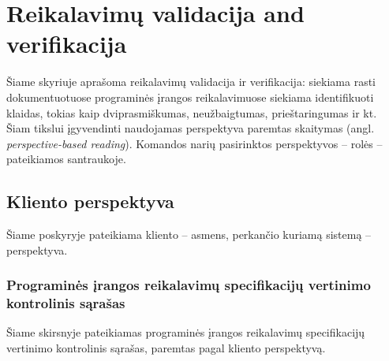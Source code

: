 \documentclass{VUMIFPSkursinis}
\begin{document}

\section{Reikalavimų validacija and verifikacija}

Šiame skyriuje aprašoma reikalavimų validacija ir verifikacija: siekiama rasti dokumentuotuose programinės įrangos
reikalavimuose siekiama identifikuoti klaidas, tokias kaip dviprasmiškumas, neužbaigtumas, prieštaringumas ir kt.
Šiam tikslui įgyvendinti naudojamas perspektyva paremtas skaitymas (angl. \textit{perspective-based reading}). Komandos narių
pasirinktos perspektyvos -- rolės -- pateikiamos santraukoje.


\subsection{Kliento perspektyva}

Šiame poskyryje pateikiama kliento -- asmens, perkančio kuriamą sistemą -- perspektyva.

\subsubsection{Programinės įrangos reikalavimų specifikacijų vertinimo kontrolinis sąrašas}

Šiame skirsnyje pateikiamas programinės įrangos reikalavimų specifikacijų vertinimo kontrolinis sąrašas, paremtas pagal kliento perspektyvą.
\end{document}
